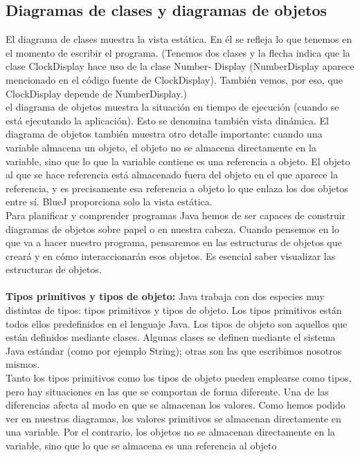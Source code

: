 \documentclass[11pt,a4paper]{article}
\begin{document}
	\subsection{Diagramas de clases y diagramas de objetos}
	El diagrama de clases
	muestra la vista estática. En él se refleja lo que tenemos en el momento de escribir el programa. (Tenemos dos clases y la flecha indica que la clase ClockDisplay hace uso de la clase Number-
	Display (NumberDisplay aparece mencionado en el código fuente de ClockDisplay). También
	vemos, por eso, que ClockDisplay depende de NumberDisplay.)\\
	el diagrama de objetos muestra la situación en tiempo de ejecución
	(cuando se está ejecutando la aplicación). Esto se denomina también vista dinámica.
	El diagrama de objetos también muestra otro detalle importante: cuando una variable almacena un
	objeto, el objeto no se almacena directamente en la variable, sino que lo que la variable contiene es
	una referencia a objeto. El objeto al que se hace referencia está almacenado
	fuera del objeto en el que aparece la referencia, y es precisamente esa referencia a objeto lo que
	enlaza los dos objetos entre sí. BlueJ proporciona solo la vista estática.\\
	Para planificar y comprender programas Java hemos de ser capaces de construir
	diagramas de objetos sobre papel o en nuestra cabeza. Cuando pensemos en lo que va a hacer
	nuestro programa, pensaremos en las estructuras de objetos que creará y en cómo interaccionarán
	esos objetos. Es esencial saber visualizar las estructuras de objetos.\\
	\\
	\textbf{Tipos primitivos y tipos de objeto:} Java trabaja con dos especies muy distintas de tipos: tipos primitivos y tipos de objeto. Los tipos primitivos
	están todos ellos predefinidos en el lenguaje Java. Los tipos de objeto son
	aquellos que están definidos mediante clases. Algunas clases se definen mediante el sistema Java
	estándar (como por ejemplo String); otras son las que escribimos nosotros mismos. \\
	Tanto los tipos primitivos como los tipos de objeto pueden emplearse como tipos, pero hay situaciones
	en las que se comportan de forma diferente. Una de las diferencias afecta al modo en
	que se almacenan los valores. Como hemos podido ver en nuestros diagramas, los valores primitivos
	se almacenan directamente en una variable. Por el contrario, los objetos no se almacenan
	directamente en la variable, sino que lo que se almacena es una referencia al objeto
\end{document}
